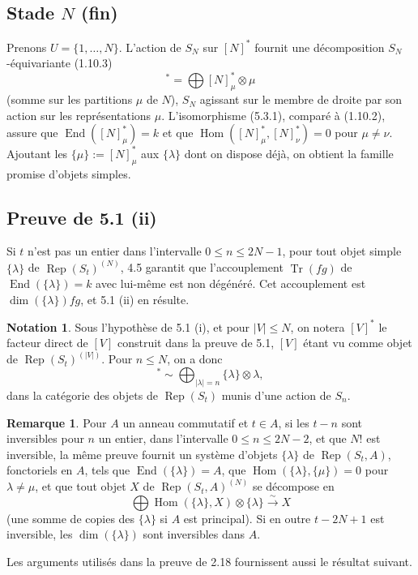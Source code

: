 \documentclass[11pt,a4paper]{article}
\theoremstyle{plain}
\theoremstyle{definition}
\newtheorem{remark}[theorem]{Remarque}
\newtheorem{notation}[theorem]{Notation}
\DeclareMathOperator{\Hom}{Hom}
\DeclareMathOperator{\End}{End}
\DeclareMathOperator{\Tr}{Tr}
\DeclareMathOperator{\Rep}{Rep}
\newcommand{\isom}{\xrightarrow{\sim}}
\begin{document}
\subsection{Stade $N$ (fin)}
Prenons $U = \{1, \ldots, N\}$. L'action de $S_N$ sur $[N]^*$ fournit une d\'ecomposition $S_N$-\'equivariante (1.10.3)
\begin{equation}
[N]^* = \bigoplus [N]^*_{\mu} \otimes \mu \tag{5.3.1}
\end{equation}
(somme sur les partitions $\mu$ de $N$), $S_N$ agissant sur le membre de droite par son action sur les repr\'esentations $\mu$. L'isomorphisme (5.3.1), compar\'e \`a (1.10.2), assure que $\End([N]^*_{\mu}) = k$ et que $\Hom([N]^*_{\mu}, [N]^*_{\nu}) = 0$ pour $\mu \neq \nu$. Ajoutant les $\{\mu\} := [N]^*_{\mu}$ aux $\{\lambda\}$ dont on dispose d\'ej\`a, on obtient la famille promise d'objets simples.

\subsection{Preuve de 5.1 (ii)}
Si $t$ n'est pas un entier dans l'intervalle $0 \leq n \leq 2N-1$, pour tout objet simple $\{\lambda\}$ de $\Rep(S_t)^{(N)}$, 4.5 garantit que l'accouplement $\Tr(fg)$ de $\End(\{\lambda\}) = k$ avec lui-m\^eme est non d\'eg\'en\'er\'e. Cet accouplement est $\dim(\{\lambda\}) fg$, et 5.1 (ii) en r\'esulte.

\begin{notation}
Sous l'hypoth\`ese de 5.1 (i), et pour $|V| \leq N$, on notera $[V]^*$ le facteur direct de $[V]$ construit dans la preuve de 5.1, $[V]$ \'etant vu comme objet de $\Rep(S_t)^{(|V|)}$. Pour $n \leq N$, on a donc
\begin{equation}
[n]^* \sim \bigoplus_{|\lambda| = n} \{\lambda\} \otimes \lambda, \tag{5.5.1}
\end{equation}
dans la cat\'egorie des objets de $\Rep(S_t)$ munis d'une action de $S_n$.
\end{notation}

\begin{remark}
Pour $A$ un anneau commutatif et $t \in A$, si les $t-n$ sont inversibles pour $n$ un entier, dans l'intervalle $0 \leq n \leq 2N-2$, et que $N!$ est inversible, la m\^eme preuve fournit un syst\`eme d'objets $\{\lambda\}$ de $\Rep(S_t, A)$, fonctoriels en $A$, tels que $\End(\{\lambda\}) = A$, que $\Hom(\{\lambda\}, \{\mu\}) = 0$ pour $\lambda \neq \mu$, et que tout objet $X$ de $\Rep(S_t, A)^{(N)}$ se d\'ecompose en
\begin{equation}
\bigoplus \Hom(\{\lambda\}, X) \otimes \{\lambda\} \isom X \tag{5.6.1}
\end{equation}
(une somme de copies des $\{\lambda\}$ si $A$ est principal). Si en outre $t - 2N + 1$ est inversible, les $\dim(\{\lambda\})$ sont inversibles dans $A$.

Les arguments utilis\'es dans la preuve de 2.18 fournissent aussi le r\'esultat suivant.
\end{remark}
\end{document}
